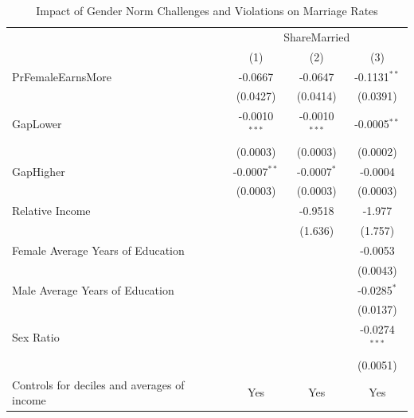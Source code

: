 
\begin{table}[htbp]
   \caption{\label{tab:main} Impact of Gender Norm Challenges and Violations on Marriage Rates}
   \bigskip
   \centering
   \begin{tabular}{lccc}
      \toprule
       & \multicolumn{3}{c}{ShareMarried}\\
                                                  & (1)             & (2)             & (3)\\  
      \midrule 
      PrFemaleEarnsMore                           & -0.0667         & -0.0647         & -0.1131$^{**}$\\   
                                                  & (0.0427)        & (0.0414)        & (0.0391)\\   
      GapLower                                    & -0.0010$^{***}$ & -0.0010$^{***}$ & -0.0005$^{**}$\\   
                                                  & (0.0003)        & (0.0003)        & (0.0002)\\   
      GapHigher                                   & -0.0007$^{**}$  & -0.0007$^{*}$   & -0.0004\\   
                                                  & (0.0003)        & (0.0003)        & (0.0003)\\   
      Relative Income                             &                 & -0.9518         & -1.977\\   
                                                  &                 & (1.636)         & (1.757)\\   
      Female Average Years of Education           &                 &                 & -0.0053\\   
                                                  &                 &                 & (0.0043)\\   
      Male Average Years of Education             &                 &                 & -0.0285$^{*}$\\   
                                                  &                 &                 & (0.0137)\\   
      Sex Ratio                                   &                 &                 & -0.0274$^{***}$\\   
                                                  &                 &                 & (0.0051)\\   
      Controls for deciles and averages of income & Yes             & Yes             & Yes\\  

\end{tabular}
\end{table}
